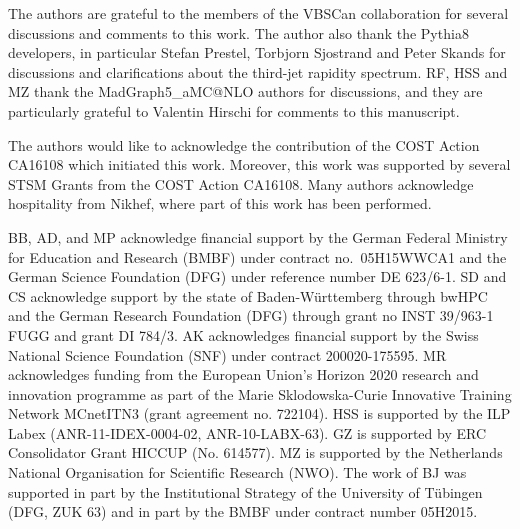 The authors are grateful to the members of the VBSCan collaboration for several discussions and comments to this work. The author also thank
the {\sc Pythia8} developers, in particular Stefan Prestel, Torbjorn Sjostrand and Peter Skands for 
discussions and clarifications about the third-jet rapidity spectrum. RF, HSS and MZ thank the {\sc MadGraph5\_aMC@NLO} authors for discussions, and
they are particularly grateful to Valentin Hirschi for comments to this manuscript.

The authors would like to acknowledge the contribution of the COST Action CA16108 which initiated this work.
Moreover, this work was supported by several STSM Grants from the COST Action CA16108.
Many authors acknowledge hospitality from Nikhef, where part of this work has been performed.

BB, AD, and MP acknowledge financial support by the
German Federal Ministry for Education and Research (BMBF) under
contract no.~05H15WWCA1 and the German Science Foundation (DFG) under
reference number DE 623/6-1.
SD and CS acknowledge support by the state of Baden-W\"urttemberg through bwHPC and the German Research Foundation (DFG) through grant no INST 39/963-1 FUGG and grant DI 784/3.
AK acknowledges financial support by the Swiss National Science Foundation (SNF) under contract 200020-175595.
MR acknowledges funding from the European Union's Horizon 2020 research and innovation programme as part of the Marie Sklodowska-Curie Innovative Training Network MCnetITN3 (grant agreement no. 722104).
HSS is supported by the ILP Labex (ANR-11-IDEX-0004-02, ANR-10-LABX-63).
GZ is supported by ERC Consolidator Grant HICCUP (No. 614577).
MZ is supported by the Netherlands National Organisation for Scientific Research (NWO). The work of BJ was supported in part by the Institutional Strategy of the University of T\"ubingen (DFG, ZUK 63) and in part by
the BMBF under contract number 05H2015.
